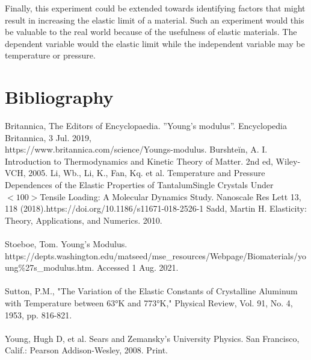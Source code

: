 \documentclass{article}
\begin{document}
\par{Finally, this experiment could be extended towards identifying factors that might result in increasing the elastic limit of a material. Such an experiment would this be valuable to the real world because of the usefulness of elastic materials. The dependent variable would the elastic limit while the independent variable may be temperature or pressure.}

\pagebreak

\section {Bibliography}
\hspace{-1.3cm}
Britannica,  The  Editors  of  Encyclopaedia.    ”Young’s  modulus”.    Encyclopedia  Britannica,  3  Jul.    2019, \\ https://www.britannica.com/science/Youngs-modulus. \newline
\newline
Burshteĭn, A. I. Introduction to Thermodynamics and Kinetic Theory of Matter. 2nd ed, Wiley-VCH, 2005.
\newline
\newline
Li, Wb., Li, K., Fan, Kq.  et al.  Temperature and Pressure Dependences of the Elastic Properties of TantalumSingle Crystals Under$<100>$Tensile Loading:  A Molecular Dynamics Study.  Nanoscale Res Lett 13, 118 (2018).https://doi.org/10.1186/s11671-018-2526-1
\newline
\newline
Sadd, Martin H. Elasticity: Theory, Applications, and Numerics. 2010.
\\
\\
Stoeboe, Tom. Young’s Modulus. https://depts.washington.edu/matseed/mse\_resources/Webpage/Biomaterials\-/young\%27s\_modulus.htm. Accessed 1 Aug. 2021.
\\
\\
Sutton, P.M., "The Variation of the Elastic Constants of Crystalline Aluminum with Temperature between 63°K and 773°K," Physical Review, Vol. 91, No. 4, 1953, pp. 816-821.
\\
\\
Young, Hugh D, et al. Sears and Zemansky's University Physics. San Francisco, Calif.: Pearson Addison-Wesley, 2008. Print.
\end{document}
